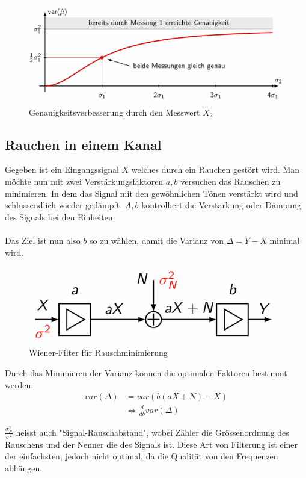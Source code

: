 \documentclass[../Main.tex]{subfiles}
\begin{document}
\begin{figure}[H]
    \centering
    \includegraphics[width=0.5\linewidth]{Images/verbesserung-genauigkeit-filter.png}
    \caption{Genauigkeitsverbesserung durch den Messwert \(X_2\)}
\end{figure}
\newpage

\subsection{Rauchen in einem Kanal}
Gegeben ist ein Eingangssignal \(X\) welches durch ein Rauchen gestört wird.
Man möchte nun mit zwei Verstärkungsfaktoren \(a,b\) versuchen das Rauschen zu minimieren.
In dem das Signal mit den gewöhnlichen Tönen verstärkt wird und schlussendlich wieder gedämpft.
\(A,b\) kontrolliert die Verstärkung oder Dämpung des Signals bei den Einheiten.
\\\\
Das Ziel ist nun also \(b\) so zu wählen, damit die Varianz von \(\Delta=Y-X\) minimal wird.

\begin{figure}[H]
    \centering
    \includegraphics[width=0.5\linewidth]{Images/wiener-filter.png}
    \caption{Wiener-Filter für Rauschminimierung}
\end{figure}

Durch das Minimieren der Varianz können die optimalen Faktoren bestimmt werden:
\begin{equation}
    \begin{split}
        var(\Delta) &= var(b(aX+N)-X)\\
        &\Rightarrow \frac{d}{db}var(\Delta)
    \end{split}
\end{equation}

\(\frac{\sigma_N^2}{\sigma^2}\) heisst auch "Signal-Rauschabstand", wobei Zähler
die Grössenordnung des Rauschens und der Nenner die des Signals ist.
Diese Art von Filterung ist einer der einfachsten, jedoch nicht optimal, da
die Qualität von den Frequenzen abhängen.
\end{document}
